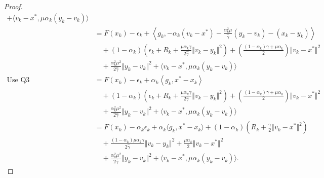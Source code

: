 \documentclass[12pt]{article}
\begin{document}
\begin{proof}
\begin{align*}
                + \langle v_k - x^*, \mu\alpha_k(y_k - v_k)\rangle
            \\
            &= 
            F(x_k) - \epsilon_k 
            + \left\langle 
                g_k, 
                - \alpha_k(v_k - x^*) 
                - \frac{\alpha_k^2\mu}{\hat \gamma}(y_k - v_k)
                - (x_k - y_k)
            \right\rangle
            \\
            &\quad 
                + (1 - \alpha_k)
                \left(
                    \epsilon_k + R_k + 
                    \frac{\mu\alpha_k\gamma}{2\hat \gamma}
                    \Vert v_k - y_k\Vert^2
                \right)
                + 
                \left(
                \frac{(1 - \alpha_k)\gamma + \mu \alpha_k}{2} 
                \right)\Vert v_k - x^*\Vert^2
            \\
            & \quad 
                + \frac{\alpha_k^2 \mu^2}{2\hat \gamma}\Vert y_k - v_k\Vert^2
                + \langle v_k - x^*, \mu\alpha_k(y_k - v_k)\rangle
            \\
            \text{Use Q3}&= 
            F(x_k) - \epsilon_k 
            + \alpha_k\left\langle 
                g_k, 
                x^* - x_k
            \right\rangle
            \\
            &\quad 
                + (1 - \alpha_k)
                \left(
                    \epsilon_k + R_k + 
                    \frac{\mu\alpha_k\gamma}{2\hat \gamma}
                    \Vert v_k - y_k\Vert^2
                \right)
                + 
                \left(
                \frac{(1 - \alpha_k)\gamma + \mu \alpha_k}{2} 
                \right)\Vert v_k - x^*\Vert^2
            \\
            & \quad 
                + \frac{\alpha_k^2 \mu^2}{2\hat \gamma}\Vert y_k - v_k\Vert^2
                + \langle v_k - x^*, \mu\alpha_k(y_k - v_k)\rangle
            \\
            &= 
            F(x_k) - \alpha_k\epsilon_k + \alpha_k\langle g_k, x^* - x_k\rangle
            + 
            (1 - \alpha_k)\left(
                R_k + \frac{\gamma}{2}\Vert v_k - x^*\Vert^2
            \right)
            \\&\quad 
                + \frac{(1 - \alpha_k)\mu\alpha_k\gamma}{2\hat \gamma}\Vert v_k - y_k\Vert^2
                + \frac{\mu \alpha_k}{2}\Vert v_k - x^*\Vert^2
            \\&\quad 
                + \frac{\alpha_k^2 \mu^2}{2\hat\gamma}\Vert y_k - v_k\Vert^2
                + \langle v_k - x^*, \mu\alpha_k(y_k - v_k)\rangle. 

\end{align*}
\end{proof}
\end{document}
